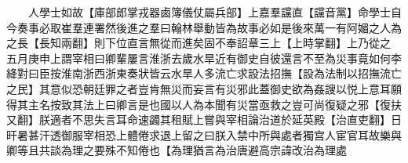 　　人學士如故【庫部郎掌戎器鹵簿儀仗屬兵部】上嘉羣讜直【讜音黨】命學士自今奏事必取崔羣連署然後進之羣曰翰林舉動皆為故事必如是後來萬一有阿媚之人為之長【長知兩翻】則下位直言無從而進矣固不奉詔章三上【上時掌翻】上乃從之　五月庚申上謂宰相曰卿輩屢言淮浙去歲水旱近有御史自彼還言不至為災事竟如何李絳對曰臣按淮南浙西浙東奏狀皆云水旱人多流亡求設法招撫【設為法制以招撫流亡之民】其意似恐朝廷罪之者豈肯無災而妄言有災邪此蓋御史欲為姦謏以悦上意耳願得其主名按致其法上曰卿言是也國以人為本聞有災當亟救之豈可尚復疑之邪【復扶又翻】朕適者不思失言耳命速蠲其租賦上嘗與宰相論治道於延英殿【治直吏翻】日旰暑甚汗透御服宰相恐上體倦求退上留之曰朕入禁中所與處者獨宫人宦官耳故樂與卿等且共談為理之要殊不知倦也【為理猶言為治唐避高宗諱改治為理處